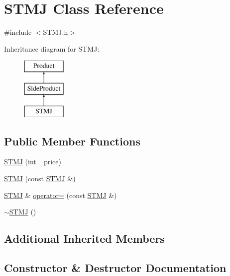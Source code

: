 \hypertarget{classSTMJ}{}\section{S\+T\+MJ Class Reference}
\label{classSTMJ}


{\ttfamily \#include $<$S\+T\+M\+J.\+h$>$}

Inheritance diagram for S\+T\+MJ\+:\begin{figure}[H]
\begin{center}
\leavevmode
\includegraphics[height=3.000000cm]{classSTMJ}
\end{center}
\end{figure}
\subsection*{Public Member Functions}
\begin{DoxyCompactItemize}
\item 
\mbox{\hyperlink{classSTMJ_a9dcd6bc2d844ffc5e09cac0e1e46ab17}{S\+T\+MJ}} (int \+\_\+price)
\item 
\mbox{\hyperlink{classSTMJ_a932e2bd4822f6a6832ce9458461c0e7f}{S\+T\+MJ}} (const \mbox{\hyperlink{classSTMJ}{S\+T\+MJ}} \&)
\item 
\mbox{\hyperlink{classSTMJ}{S\+T\+MJ}} \& \mbox{\hyperlink{classSTMJ_a62856b0934c8285d47b972ec16b64546}{operator=}} (const \mbox{\hyperlink{classSTMJ}{S\+T\+MJ}} \&)
\item 
\mbox{\hyperlink{classSTMJ_ad54896782f5156caa09feaa23b634b83}{$\sim$\+S\+T\+MJ}} ()
\end{DoxyCompactItemize}
\subsection*{Additional Inherited Members}


\subsection{Constructor \& Destructor Documentation}
\mbox{\label{classSTMJ_a9dcd6bc2d844ffc5e09cac0e1e46ab17}} 

